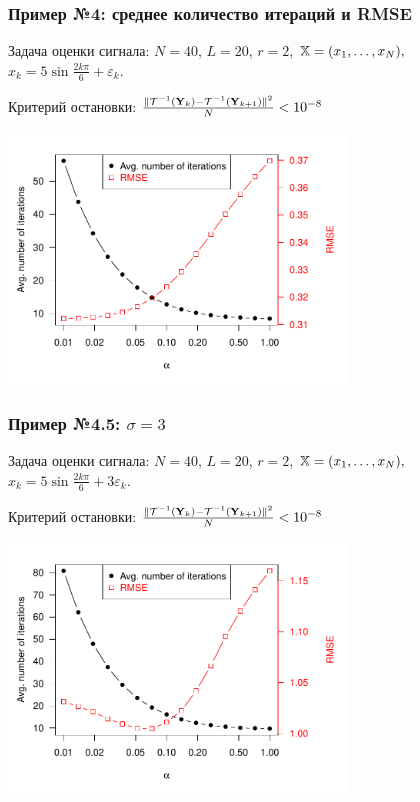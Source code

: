 \documentclass[unicode, notheorems]{beamer}
\begin{document}
\begin{frame}
	\frametitle{Пример №4: среднее количество итераций и RMSE}
	Задача оценки сигнала: $N = 40$, $L = 20$, $r = 2$, $\mathbb{X} = (x_{1}, \ldots, x_N),$  $x_k = 5\sin{\frac{2 k \pi}{6}} + \varepsilon_k$.
	
	Критерий остановки: $\frac{\|\mathcal{T}^{-1}(\mathbf{Y}_k) - \mathcal{T}^{-1}(\mathbf{Y}_{k + 1})\|^2}{N} < 10^{-8}$
	\vspace{-0.4cm}
	\begin{center}
		\includegraphics*[width = 9cm]{2axis.pdf}
	\end{center}
\end{frame}

\begin{frame}
	\frametitle{Пример №4.5: $\sigma = 3$}
	Задача оценки сигнала: $N = 40$, $L = 20$, $r = 2$, $\mathbb{X} = (x_{1}, \ldots, x_N),$  $x_k = 5\sin{\frac{2 k \pi}{6}} + 3 \varepsilon_k$.
	
	Критерий остановки: $\frac{\|\mathcal{T}^{-1}(\mathbf{Y}_k) - \mathcal{T}^{-1}(\mathbf{Y}_{k + 1})\|^2}{N} < 10^{-8}$
	\vspace{-0.4cm}
	\begin{center}
		\includegraphics*[width = 9cm]{2axis-3.pdf}
	\end{center}
\end{frame}
\end{document}
